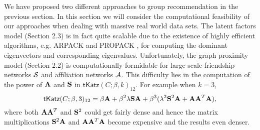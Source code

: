 We have proposed two different approaches to group recommendation in the previous section. In this section we will consider the computational feasibility of our approaches when dealing with massive real world data sets. The latent factors model (Section 2.3) is in fact quite scalable due to the existence of highly efficient algorithms, e.g. ARPACK \cite{arpack98} and PROPACK \cite{larsen98}, for computing the dominant eigenvectors and corresponding eigenvalues. Unfortunately, the graph proximity model (Section 2.2) is computationally formidable for large scale friendship networks $\mathcal{S}$ and affiliation networks $\mathcal{A}$. This difficulty lies in the computation of the power of $\mathbf{A}$ and $\mathbf{S}$ in $\textsf{tKatz}(C;\beta,k)_{12}$. For example when $k = 3$,
\[
 \textsf{tKatz}(C;\beta,3)_{12} = \beta \mathbf{A} + \beta^2 \lambda \mathbf{S} \mathbf{A} +  \beta^3(\lambda^2 \mathbf{S}^2 \mathbf{A} + \mathbf{A} \mathbf{A}^T \mathbf{A}),
\]
where both $\mathbf{A} \mathbf{A}^T$ and $\mathbf{S}^2$ could get fairly dense and hence the matrix multiplications $\mathbf{S}^2 \mathbf{A}$ and $\mathbf{A} \mathbf{A}^T \mathbf{A}$ become expensive and the results even denser.

